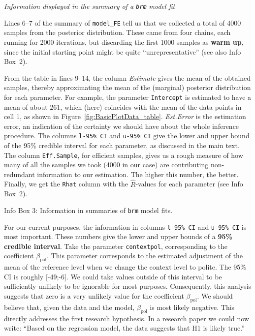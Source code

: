 \documentclass[nobib]{tufte-handout}
\begin{document}
\begin{InfoBox}[t]
\centering
\colorbox{mygray}{\centering
  \begin{minipage}{1.0\textwidth}

    \emph{Information displayed in the summary of a \texttt{brm} model fit}
    \medskip

    Lines 6--7 of the summary of \texttt{model\_FE} tell us that we collected a total of 4000 samples from the posterior distribution. These came from four chains, each running for 2000 iterations, but discarding the first 1000 samples as \textbf{warm up}, since the initial starting point might be quite ``unrepresentative'' (see also Info Box~2).
    
    From the table in lines 9--14, the column \emph{Estimate} gives the mean of the obtained
    samples, thereby approximating the mean of the (marginal) posterior distribution for each
    parameter. For example, the parameter \texttt{Intercept} is estimated to have a mean of
    about $261$, which (here) coincides with the mean of the data points in cell 1, as shown in
    Figure~\ref{fig:BasicPlotData_table}. \emph{Est.Error} is the estimation error, an
    indication of the certainty we should have about the whole inference procedure. The columns
    \texttt{l-95\% CI} and \texttt{u-95\% CI} give the lower and upper bound of the 95\%
    credible interval for each parameter, as discussed in the main text. The column
    \texttt{Eff.Sample}, for efficient samples, gives us a rough measure of how many of all the
    samples we took (4000 in our case) are contributing non-redundant information to our
    estimation. The higher this number, the better. Finally, we get the \texttt{Rhat} column
    with the $\hat{R}$-values for each parameter (see Info Box~2).
    
  \end{minipage} \par
  } \par
  \begin{center}
    Info Box 3: Information in summaries of \texttt{brm} model fits.
  \end{center}
\end{InfoBox}


For our current purposes, the information in  columns \texttt{l-95\% CI} and \texttt{u-95\% CI} is most important.
These numbers give the lower and upper bounds of a \textbf{95\% credible interval}.
Take the parameter \texttt{contextpol}, corresponding to the coefficient $\beta_{\text{pol}}$.
This parameter corresponds to the estimated adjustment of the mean of the reference level when we change the context level to polite.
The 95\% CI is roughly [-49;-6].
We could take values outside of this interval to be sufficiently unlikely to be ignorable for most purposes.
Consequently, this analysis suggests that zero is a very unlikely value for the coefficient
$\beta_{\text{pol}}$.
We should believe that, given the data and the model, $\beta_{\text{pol}}$ is most likely negative.
This directly addresses the first research hypothesis.
In a research paper we could now write: ``Based on the regression model, the data suggests that H1 is likely true.''
\end{document}
